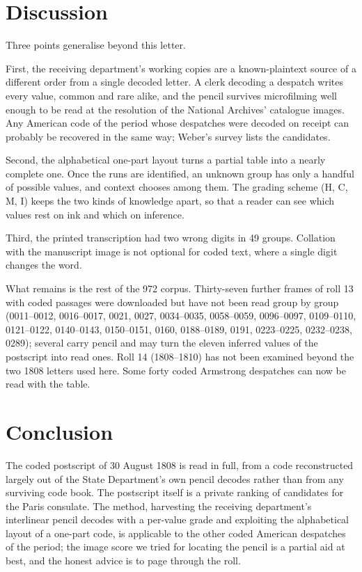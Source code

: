 \documentclass[]{interact}
\begin{document}
\section{Discussion}\label{sec:disc}

Three points generalise beyond this letter.

First, the receiving department's working copies are a known-plaintext source of a different order from a single decoded letter. A clerk decoding a despatch writes every value, common and rare alike, and the pencil survives microfilming well enough to be read at the resolution of the National Archives' catalogue images. Any American code of the period whose despatches were decoded on receipt can probably be recovered in the same way; Weber's survey \citeyearpar{Weber:1979} lists the candidates.

Second, the alphabetical one-part layout turns a partial table into a nearly complete one. Once the runs are identified, an unknown group has only a handful of possible values, and context chooses among them. The grading scheme (H, C, M, I) keeps the two kinds of knowledge apart, so that a reader can see which values rest on ink and which on inference.

Third, the printed transcription had two wrong digits in 49 groups. Collation with the manuscript image is not optional for coded text, where a single digit changes the word.

What remains is the rest of the 972 corpus. Thirty-seven further frames of roll 13 with coded passages were downloaded but have not been read group by group (0011--0012, 0016--0017, 0021, 0027, 0034--0035, 0058--0059, 0096--0097, 0109--0110, 0121--0122, 0140--0143, 0150--0151, 0160, 0188--0189, 0191, 0223--0225, 0232--0238, 0289); several carry pencil and may turn the eleven inferred values of the postscript into read ones. Roll 14 (1808--1810) has not been examined beyond the two 1808 letters used here. Some forty coded Armstrong despatches can now be read with the table.

\section{Conclusion}

The coded postscript of 30 August 1808 is read in full, from a code reconstructed largely out of the State Department's own pencil decodes rather than from any surviving code book. The postscript itself is a private ranking of candidates for the Paris consulate. The method, harvesting the receiving department's interlinear pencil decodes with a per-value grade and exploiting the alphabetical layout of a one-part code, is applicable to the other coded American despatches of the period; the image score we tried for locating the pencil is a partial aid at best, and the honest advice is to page through the roll.
\end{document}
